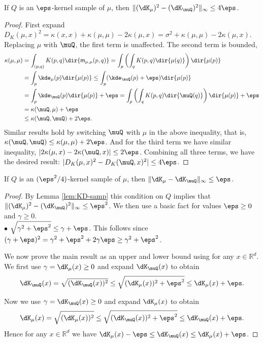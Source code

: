 \documentclass[11pt]{myclass}
\begin{document}
\begin{lemma}
\label{lem:KD-samp}
If $Q$ is an $\eps$-kernel sample of $\mu$, then $\| (\dK_\mu)^2 - (\dK_\muQ)^2 \|_\infty \leq 4\eps$. 
\end{lemma}
\begin{proof}
First expand $D_K(\mu,x)^2 =  \kappa(x,x) + \kappa(\mu,\mu)  - 2 \kappa(\mu,x) = \sigma^2 + \kappa(\mu,\mu)  - 2 \kappa(\mu,x)$.  
Replacing $\mu$ with $\muQ$, 
the first term is unaffected.  The second term is bounded, 
\begin{align*}
\kappa(\mu,\mu) &= \int_{(p,q)} K(p,q) \dir{\textsf{m}_{\mu,\mu}(p,q)}
=  
\int_p \left( \int_q K(p,q) \dir{\mu(q)} \right) \dir{\mu(p)}
\\ &=
\int_p \kde_{\mu}(p) \dir{\mu(p)}
\leq 
\int_p (\kde_{\muQ}(p) + \eps) \dir{\mu(p)}
\\ &=  
\int_p \kde_{\muQ}(p) \dir{\mu(p)} + \eps
= \int_p \left( \int_q K(p,q) \dir{\muQ(q)} \right) \dir{\mu(p)} + \eps
\\ & = 
\kappa(\muQ, \mu) + \eps
\\ & \leq  \kappa(\muQ, \muQ) + 2 \eps. 
\end{align*}
Similar results hold by switching $\muQ$ with $\mu$ in the above inequality, that is, 
$\kappa(\muQ,\muQ) \leq \kappa(\mu,\mu)  + 2\eps$.   
And for the third term we have similar inequality, $|2\kappa(\mu, x) - 2\kappa(\muQ,x)| \leq 2\eps$.
Combining all three terms,  we have the desired result: 
  $| D_K(\mu,x)^2 - D_K(\muQ,x)^2 | \leq 4\eps$. 
\end{proof}


\begin{lemma}
\label{lem:KD-samp-nosq}
If $Q$ is an $(\eps^2/4)$-kernel sample of $\mu$, then $\| \dK_\mu - \dK_\muQ \|_\infty \leq \eps$. 
\end{lemma}
\begin{proof}
By Lemma \ref{lem:KD-samp} this condition on $Q$ implies that $\| (\dK_\mu)^2 - (\dK_\muQ)^2\|_\infty \leq \eps^2$.  
We then use a basic fact for values $\eps \geq 0$ and $\gamma \geq 0$.  
\\
$\bullet$ $\sqrt{\gamma^2 + \eps^2} \leq \gamma + \eps$.  This follows since
$(\gamma + \eps)^2 = \gamma^2 + \eps^2 + 2 \gamma\eps \geq \gamma^2 + \eps^2$.

We now prove the main result as an upper and lower bound using for any $x \in \mathbb{R}^d$.  
We first use $\gamma = \dK_\mu(x) \geq 0$ and expand $\dK_\muQ(x)$ to obtain
\[
\dK_\muQ(x) = \sqrt{(\dK_\muQ(x))^2} \leq \sqrt{(\dK_\mu(x))^2 + \eps^2} \leq \dK_\mu(x) + \eps.  
\]

Now we use $\gamma = \dK_\muQ(x) \geq 0$ and expand $\dK_\mu(x)$ to obtain
\[
\dK_\mu(x) = \sqrt{(\dK_\mu(x))^2} \leq \sqrt{(\dK_\muQ(x))^2 + \eps^2} \leq \dK_\muQ(x) + \eps.  
\]
Hence for any $x \in \mathbb{R}^d$ we have $\dK_\mu(x) - \eps \leq \dK_\muQ(x) \leq \dK_\mu(x) + \eps$.  
\end{proof}
\end{document}
